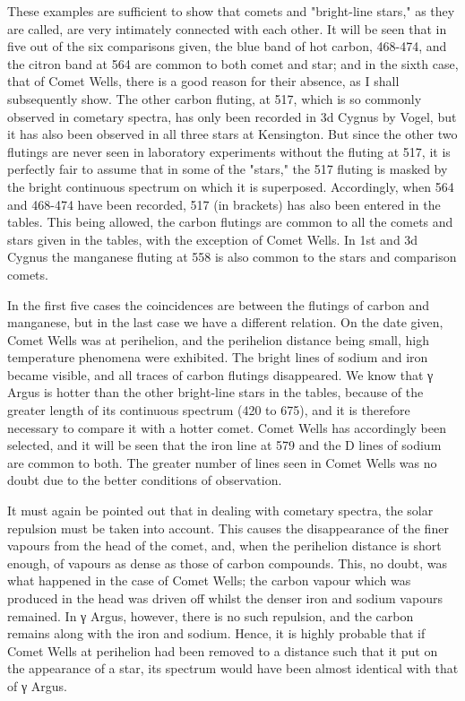 \documentclass[a4paper, 12pt, oneside, polutonikogreek, english]{article}
\begin{document}
These examples are sufficient to show that comets and "bright-line stars," as they are called, are very intimately connected with each other. It will be seen that in five out of the six comparisons given, the blue band of hot carbon, 468-474, and the citron band at 564 are common to both comet and star; and in the sixth case, that of Comet Wells, there is a good reason for their absence, as I shall subsequently show. The other carbon fluting, at 517, which is so commonly observed in cometary spectra, has only been recorded in 3d Cygnus by Vogel, but it has also been observed in all three stars at Kensington. But since the other two flutings are never seen in laboratory experiments without the fluting at 517, it is perfectly fair to assume that in some of the "stars," the 517 fluting is masked by the bright continuous spectrum on which it is superposed. Accordingly, when 564 and 468-474 have been recorded, 517 (in brackets) has also been entered in the tables. This being allowed, the carbon flutings are common to all the comets and stars given in the tables, with the exception of Comet Wells. In 1st and 3d Cygnus the manganese fluting at 558 is also common to the stars and comparison comets.

In the first five cases the coincidences are between the flutings of carbon and manganese, but in the last case we have a different relation. On the date given, Comet Wells was at perihelion, and the perihelion distance being small, high temperature phenomena were exhibited. The bright lines of sodium and iron became visible, and all traces of carbon flutings disappeared. We know that γ Argus is hotter than the other bright-line stars in the tables, because of the greater length of its continuous spectrum (420 to 675), and it is therefore necessary to compare it with a hotter comet. Comet Wells has accordingly been selected, and it will be seen that the iron line at 579 and the D lines of sodium are common to both. The greater number of lines seen in Comet Wells was no doubt due to the better conditions of observation.

It must again be pointed out that in dealing with cometary spectra, the solar repulsion must be taken into account. This causes the disappearance of the finer vapours from the head of the comet, and, when the perihelion distance is short enough, of vapours as dense as those of carbon compounds. This, no doubt, was what happened in the case of Comet Wells; the carbon vapour which was produced in the head was driven off whilst the denser iron and sodium vapours remained. In γ Argus, however, there is no such repulsion, and the carbon remains along with the iron and sodium. Hence, it is highly probable that if Comet Wells at perihelion had been removed to a distance such that it put on the appearance of a star, its spectrum would have been almost identical with that of γ Argus.
\end{document}
